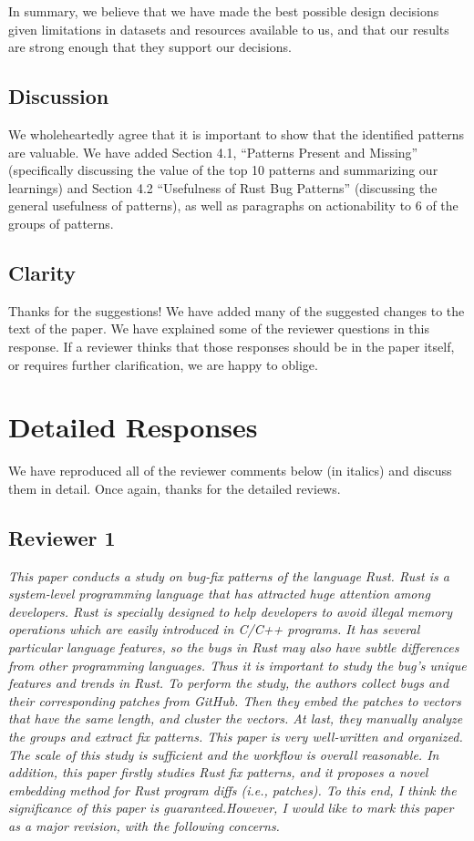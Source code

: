 \documentclass{article}
\begin{document}
In summary, we believe that we have made the best possible design decisions given limitations in datasets and resources available to us, and that our results are strong enough that they support our decisions.

\subsection{Discussion}

We wholeheartedly agree that it is important to show that the identified patterns are valuable. We have added Section 4.1, “Patterns Present and Missing” (specifically discussing the value of the top 10 patterns and summarizing our learnings) and Section 4.2 “Usefulness of Rust Bug Patterns” (discussing the general usefulness of patterns), as well as paragraphs on actionability to 6 of the groups of patterns. 

\subsection{Clarity}

Thanks for the suggestions! We have added many of the suggested changes to the text of the paper. We have explained some of the reviewer questions in this response. If a reviewer thinks that those responses should be in the paper itself, or requires further clarification, we are happy to oblige.

\section{Detailed Responses}
\label{sec:detailed}
We have reproduced all of the reviewer comments below (in italics) and discuss them in detail. Once again, thanks for the detailed reviews.

\subsection{Reviewer 1}

\textit{This paper conducts a study on bug-fix patterns of the language Rust. Rust is a system-level programming language that has attracted huge attention among developers. Rust is specially designed to help developers to avoid illegal memory operations which are easily introduced in C/C++ programs. It has several particular language features, so the bugs in Rust may also have subtle differences from other programming languages. Thus it is important to study the bug's unique features and trends in Rust.
To perform the study, the authors collect bugs and their corresponding patches from GitHub. Then they embed the patches to vectors that have the same length, and cluster the vectors. At last, they manually analyze the groups and extract fix patterns.
This paper is very well-written and organized. The scale of this study is sufficient and the workflow is overall reasonable. In addition, this paper firstly studies Rust fix patterns, and it proposes a novel embedding method for Rust program diffs (i.e., patches). To this end, I think the significance of this paper is guaranteed.However, I would like to mark this paper as a major revision, with the following concerns.}
\end{document}
